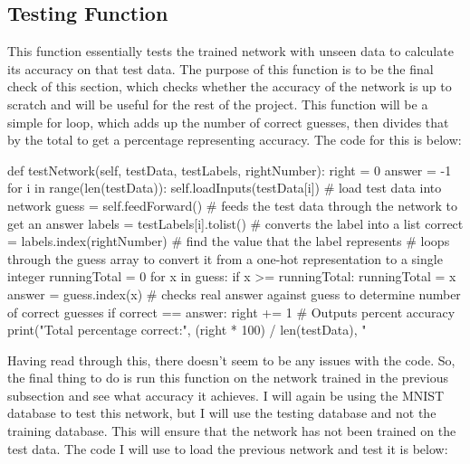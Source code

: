 \documentclass{report}
\begin{document}
\subsection{Testing Function}
This function essentially tests the trained network with unseen data to calculate its accuracy on that test data. The purpose of this function is to be the final check of this section, which checks whether the accuracy of the network is up to scratch and will be useful for the rest of the project. This function will be a simple for loop, which adds up the number of correct guesses, then divides that by the total to get a percentage representing accuracy. The code for this is below:
\begin{python}
def testNetwork(self, testData, testLabels, rightNumber):
    right = 0
    answer = -1
    for i in range(len(testData)):
        self.loadInputs(testData[i])  # load test data into network
        guess = self.feedForward()  # feeds the test data through the network to get an answer
        labels = testLabels[i].tolist()  # converts the label into a list
        correct = labels.index(rightNumber)  # find the value that the label represents
        # loops through the guess array to convert it from a one-hot representation to a single integer
        runningTotal = 0
        for x in guess:
            if x >= runningTotal:
                runningTotal = x
                answer = guess.index(x)
        # checks real answer against guess to determine number of correct guesses
        if correct == answer:
            right += 1
    # Outputs percent accuracy
    print("Total percentage correct:", (right * 100) / len(testData), "%
\end{python}
Having read through this, there doesn't seem to be any issues with the code. So, the final thing to do is run this function on the network trained in the previous subsection and see what accuracy it achieves. I will again be using the MNIST database to test this network, but I will use the testing database and not the training database. This will ensure that the network has not been trained on the test data. 
\newline
The code I will use to load the previous network and test it is below:
\end{document}
